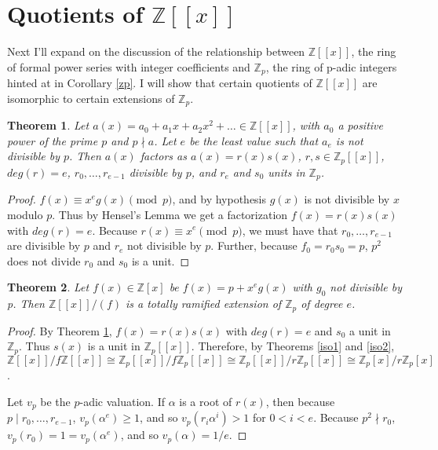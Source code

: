 \documentclass{article}
\newtheorem{theorem}{Theorem}
\begin{document}
\section{Quotients of $\mathbb{Z}[[x]]$}

Next I'll expand on the discussion of the relationship between $\mathbb{Z}[[x]]$, the ring of formal power series with integer coefficients and $\mathbb{Z}_p$, the ring of p-adic integers hinted at in Corollary \ref{zp}.  I will show that certain quotients of $\mathbb{Z}[[x]]$ are isomorphic to certain extensions of $\mathbb{Z}_p$.

\begin{theorem} \label{factor}
Let $a(x) = a_0 + a_1x + a_2x^2 + \ldots \in \mathbb{Z}[[x]]$, with $a_0$ a positive power of the prime $p$ and $p \nmid a$.  Let $e$ be the least value such that $a_e$ is not divisible by $p$.  Then $a(x)$ factors as $a(x) = r(x)s(x)$, $r,s \in \mathbb{Z}_p[[x]]$, $deg(r) = e$, $r_0, \ldots, r_{e-1}$ divisible by $p$, and $r_e$ and $s_0$ units in $\mathbb{Z}_p$.
\end{theorem}

\begin{proof}
$f(x) \equiv x^e g(x) \pmod{p}$, and by hypothesis $g(x)$ is not divisible by $x$ modulo $p$.  Thus by Hensel's Lemma we get a factorization $f(x) = r(x)s(x)$ with $deg(r) = e$.  Because $r(x) \equiv x^e \pmod{p}$, we must have that $r_0, \ldots, r_{e-1}$ are divisible by $p$ and $r_e$ not divisible by $p$.  Further, because $f_0 = r_0 s_0 = p$, $p^2$ does not divide $r_0$ and $s_0$ is a unit.
\end{proof}


\begin{theorem}
Let $f(x) \in \mathbb{Z}[x]$ be $f(x) = p + x^e g(x)$ with $g_0$ not divisible by p.  Then $\mathbb{Z}[[x]]/(f)$ is a totally ramified extension of $\mathbb{Z}_p$ of degree $e$.
\end{theorem}

\begin{proof}
By Theorem \ref{factor}, $f(x) = r(x)s(x)$ with $deg(r) = e$ and $s_0$ a unit in $\mathbb{Z}_p$.  Thus $s(x)$ is a unit in $\mathbb{Z}_p[[x]]$.  Therefore, by Theorems \ref{iso1} and \ref{iso2}, $\mathbb{Z}[[x]]/f\mathbb{Z}[[x]] \cong \mathbb{Z}_p[[x]]/f\mathbb{Z}_p[[x]] \cong \mathbb{Z}_p[[x]]/r\mathbb{Z}_p[[x]] \cong \mathbb{Z}_p[x]/r\mathbb{Z}_p[x]$.

Let $v_p$ be the $p$-adic valuation.  If $\alpha$ is a root of $r(x)$, then because $p \mid r_0, \ldots, r_{e-1}$, $v_p(\alpha^e) \ge 1$, and so $v_p(r_i \alpha^i) > 1$ for $0 < i < e$. Because $p^2 \nmid r_0$, $v_p(r_0) = 1 = v_p(\alpha^e)$, and so $v_p(\alpha) = 1/e$.

\end{proof}



\end{document}
